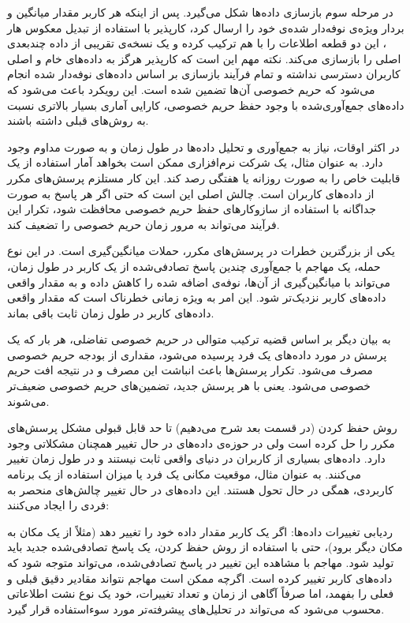

در مرحله سوم بازسازی داده‌ها شکل می‌گیرد. پس از اینکه هر کاربر مقدار میانگین و بردار ویژه‌ی نوفه‌دار شده‌ی خود را ارسال کرد، کارپذیر با استفاده از تبدیل معکوس هار ، این دو قطعه اطلاعات را با هم ترکیب کرده و یک نسخه‌ی تقریبی از داده چندبعدی اصلی را بازسازی می‌کند. نکته مهم این است که کارپذیر هرگز به داده‌های خام و اصلی کاربران دسترسی نداشته و تمام فرآیند بازسازی بر اساس داده‌های نوفه‌دار شده انجام می‌شود که حریم خصوصی آن‌ها تضمین شده است. این رویکرد باعث می‌شود که داده‌های جمع‌آوری‌شده با وجود حفظ حریم خصوصی، کارایی آماری بسیار بالاتری نسبت به روش‌های قبلی داشته باشند.


در اکثر اوقات، نیاز به جمع‌آوری و تحلیل داده‌ها در طول زمان و به صورت مداوم  وجود دارد. به عنوان مثال، یک شرکت نرم‌افزاری ممکن است بخواهد آمار استفاده از یک قابلیت خاص را به صورت روزانه یا هفتگی رصد کند. این کار مستلزم پرسش‌های مکرر از داده‌های کاربران است. چالش اصلی این است که حتی اگر هر پاسخ به صورت جداگانه با استفاده از سازوکارهای حفظ حریم خصوصی محافظت شود، تکرار این فرآیند می‌تواند به مرور زمان حریم خصوصی را تضعیف کند.

یکی از بزرگترین خطرات در پرسش‌های مکرر، حملات میانگین‌گیری است. در این نوع حمله، یک مهاجم با جمع‌آوری چندین پاسخ تصادفی‌شده از یک کاربر در طول زمان، می‌تواند با میانگین‌گیری از آن‌ها، نوفه‌ی اضافه شده را کاهش داده و به مقدار واقعی داده‌های کاربر نزدیک‌تر شود. این امر به ویژه زمانی خطرناک است که مقدار واقعی داده‌های کاربر در طول زمان ثابت باقی بماند.

به بیان دیگر بر اساس قضیه ترکیب متوالی در حریم خصوصی تفاضلی، هر بار که یک پرسش در مورد داده‌های یک فرد پرسیده می‌شود، مقداری از بودجه حریم خصوصی مصرف می‌شود. تکرار پرسش‌ها باعث انباشت این مصرف و در نتیجه افت حریم خصوصی می‌شود. یعنی با هر پرسش جدید، تضمین‌های حریم خصوصی ضعیف‌تر می‌شوند.

روش حفظ کردن (در قسمت بعد شرح می‌دهیم) تا حد قابل قبولی مشکل پرسش‌های مکرر را حل کرده است ولی در حوزه‌ی داده‌های در حال تغییر همچنان مشکلاتی وجود دارد. داده‌های بسیاری از کاربران در دنیای واقعی ثابت نیستند و در طول زمان تغییر می‌کنند. به عنوان مثال، موقعیت مکانی یک فرد یا میزان استفاده از یک برنامه کاربردی، همگی در حال تحول هستند. این داده‌های در حال تغییر چالش‌های منحصر به فردی را ایجاد می‌کنند:


 ردیابی تغییرات داده‌ها: اگر یک کاربر مقدار داده خود را تغییر دهد (مثلاً از یک مکان به مکان دیگر برود)، حتی با استفاده از روش حفظ کردن، یک پاسخ تصادفی‌شده جدید باید تولید شود. مهاجم با مشاهده این تغییر در پاسخ تصادفی‌شده، می‌تواند متوجه شود که داده‌های کاربر تغییر کرده است. اگرچه ممکن است مهاجم نتواند مقادیر دقیق قبلی و فعلی را بفهمد، اما صرفاً آگاهی از زمان و تعداد تغییرات، خود یک نوع نشت اطلاعاتی محسوب می‌شود که می‌تواند در تحلیل‌های پیشرفته‌تر مورد سوءاستفاده قرار گیرد.

